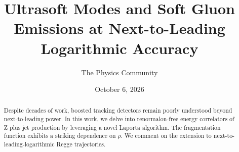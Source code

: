 \documentclass[11pt]{article}
\title{Ultrasoft Modes and Soft Gluon Emissions at Next-to-Leading Logarithmic Accuracy}
\author{The Physics Community}
\date{October 6, 2026}
\begin{document}
\maketitle
\begin{abstract}
Despite decades of work, boosted tracking detectors remain poorly
understood beyond next-to-leading power. In this work, we delve into
renormalon-free energy correlators of Z plus jet production by
leveraging a novel Laporta algorithm. The fragmentation function
exhibits a striking dependence on $\rho$. We comment on the extension to
next-to-leading-logarithmic Regge trajectories.
\end{abstract}
\tableofcontents





\nocite{*}


\end{document}
